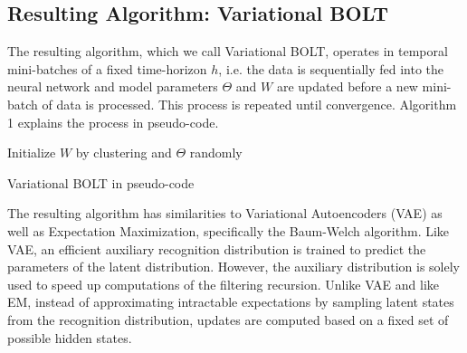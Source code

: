 \subsection{Resulting Algorithm: Variational BOLT}

The resulting algorithm, which we call Variational BOLT, operates in temporal mini-batches of a fixed time-horizon $h$, i.e. the data is sequentially fed into the neural network and model parameters $\Theta$ and $W$ are updated before a new mini-batch of data is processed. This process is repeated until convergence. Algorithm 1 explains the process in pseudo-code.


\begin{algorithm}[htb]
Initialize $W$ by clustering and $\Theta$ randomly\;
\caption{Variational BOLT in pseudo-code}
\end{algorithm}


The resulting algorithm has similarities to Variational Autoencoders (VAE) as well as Expectation Maximization, specifically the Baum-Welch algorithm. Like VAE, an efficient auxiliary recognition distribution is trained to predict the parameters of the latent distribution. However, the auxiliary distribution is solely used to speed up computations of the filtering recursion. Unlike VAE and like EM, instead of approximating intractable expectations by sampling latent states from the recognition distribution, updates are computed based on a fixed set of possible hidden states.

